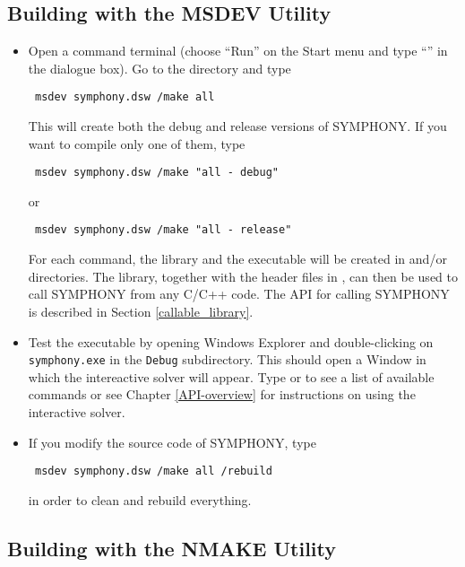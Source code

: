 \subsection{Building with the MSDEV Utility}
\label{using_msdev}
\begin{itemize}
\item Open a command terminal (choose ``Run'' on the Start menu and type
``'' in the dialogue box). Go to the 
directory and type 
{\color{Brown}
\begin{verbatim}
 msdev symphony.dsw /make all
\end{verbatim}
}
This will create both the debug and release versions of SYMPHONY. If you 
want to compile only one of them, type
{\color{Brown}
\begin{verbatim}
 msdev symphony.dsw /make "all - debug"
\end{verbatim}
}
or 
{\color{Brown}
\begin{verbatim}
 msdev symphony.dsw /make "all - release"
\end{verbatim}
}
For each command, the library  and the executable 
 will be created in  and/or 
directories.  The library, together with the header files in 
, can then be 
used to call SYMPHONY from any C/C++ code. The API for calling SYMPHONY is 
described in Section \ref{callable_library}.

\item Test the executable by opening Windows Explorer and double-clicking
on {\color{Brown}\texttt{symphony.exe}} in the
{\color{Brown}\texttt{Debug\bs}} subdirectory. This should open a Window in
which the intereactive solver will appear. Type  or  to see
a list of available commands or see Chapter
\ref{API-overview} for instructions on using the interactive solver.

\item If you modify the source code of SYMPHONY, type 
{\color{Brown}
\begin{verbatim}
 msdev symphony.dsw /make all /rebuild
\end{verbatim}
}
in order to clean and rebuild everything.
\end{itemize} 

\subsection{Building with the NMAKE Utility}
\label{using_nmake}

